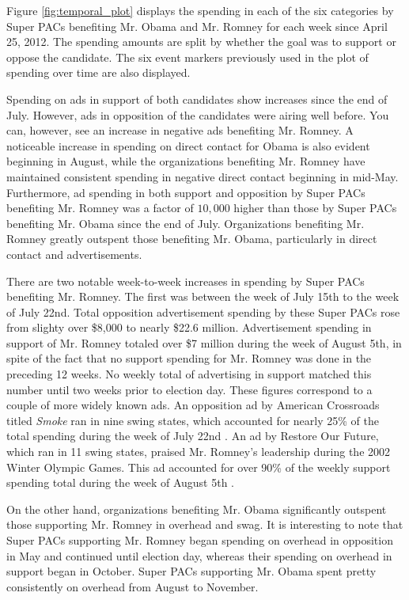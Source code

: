 \documentclass[11pt]{article}\usepackage{graphicx, color}
\begin{document}
Figure \ref{fig:temporal_plot} displays the spending in each of the six categories by Super PACs benefiting Mr. Obama and Mr. Romney for each week since April 25, 2012. The spending amounts are split by whether the goal was to support or oppose the candidate. The six event markers previously used in the plot of spending over time are also displayed.

Spending on ads in support of both candidates show increases since the end of July. However, ads in opposition of the candidates were airing well before. You can, however, see an increase in negative ads benefiting Mr. Romney. A noticeable increase in spending on direct contact for Obama is also evident beginning in August, while the organizations benefiting Mr. Romney have maintained consistent spending in negative direct contact beginning in mid-May. Furthermore, ad spending in both support and opposition by Super PACs benefiting Mr. Romney was a factor of $10,000$ higher than those by Super PACs benefiting Mr. Obama since the end of July. Organizations benefiting Mr. Romney greatly outspent those benefiting Mr. Obama, particularly in direct contact and advertisements.

There are two notable week-to-week increases in spending by Super PACs benefiting Mr. Romney. The first was between the week of July 15th to the week of July 22nd. Total opposition advertisement spending by these Super PACs rose from slighty over \$8,000 to nearly \$22.6 million. Advertisement spending in support of Mr. Romney totaled over \$7 million during the week of August 5th, in spite of the fact that no support spending for Mr. Romney was done in the preceding 12 weeks. No weekly total of advertising in support matched this number until two weeks prior to election day. These figures correspond to a couple of more widely known ads. An opposition ad by American Crossroads titled \textit{Smoke} ran in nine swing states, which accounted for nearly 25\% of the total spending during the week of July 22nd \cite{kw-crossroads}. An ad by Restore Our Future, which ran in 11 swing states, praised Mr. Romney's leadership during the 2002 Winter Olympic Games. This ad accounted for over 90\% of the weekly support spending total during the week of August 5th \cite{ap-restore}.

On the other hand, organizations benefiting Mr. Obama significantly outspent those supporting Mr. Romney in overhead and swag. It is interesting to note that Super PACs supporting Mr. Romney began spending on overhead in opposition in May and continued until election day, whereas their spending on overhead in support began in October. Super PACs supporting Mr. Obama spent pretty consistently on overhead from August to November.
\end{document}
